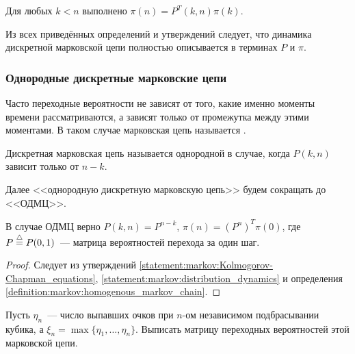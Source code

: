 \begin{statement}
    \label{statement:markov:distribution_dynamics}
    Для любых $ k < n $ выполнено $ \pi(n) = P^T(k,n) \pi(k) $.
\end{statement}

Из всех приведённых определений и утверждений следует,
что динамика дискретной марковской цепи полностью описывается в терминах $ P $ и $ \pi $.



\subsubsection{Однородные дискретные марковские цепи} \label{subsubsection:markov:homogenous}

Часто переходные вероятности не зависят от того, какие именно моменты времени рассматриваются,
а зависят только от промежутка между этими моментами.
В таком случае марковская цепь называется .

\begin{definition}
    \label{definition:markov:homogenous_markov_chain}
    Дискретная марковская цепь называется однородной в случае,
    когда $ P(k,n) $ зависит только от $ n - k $.
\end{definition}

Далее <<однородную дискретную марковскую цепь>> будем сокращать до <<ОДМЦ>>.

\begin{corollary}
    \label{corollary:markov:transition_matrix_power}
    В случае ОДМЦ верно $ P(k,n) = P^{n - k} $, $ \pi(n) = (P^n)^T \pi(0) $, где $ P \overset{\triangle}{=} P(0,1) $~---
    матрица вероятностей перехода за один шаг.
\end{corollary}

\begin{proof}
    Следует из утверждений \ref{statement:markov:Kolmogorov-Chapman_equations}, \ref{statement:markov:distribution_dynamics} и определения \ref{definition:markov:homogenous_markov_chain}.
\end{proof}

\begin{exercise}
    \label{exercise:markov:dice}
    Пусть $ \eta_n $~--- число выпавших очков при $ n $-ом независимом подбрасывании кубика,
    а $ \xi_n = \max \{\eta_1, \ldots, \eta_n \} $.
    Выписать матрицу переходных вероятностей этой марковской цепи.
\end{exercise}

